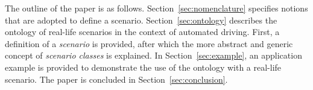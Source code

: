 The outline of the paper is as follows. Section~\ref{sec:nomenclature} specifies notions that are adopted to define a scenario. Section~\ref{sec:ontology} describes the ontology of real-life scenarios in the context of automated driving. First, a definition of a \emph{scenario} is provided, after which the more abstract and generic concept of \emph{scenario classes} is explained. In Section~\ref{sec:example}, an application example is provided to demonstrate the use of the ontology with a real-life scenario. 
The paper is concluded in Section~\ref{sec:conclusion}.
